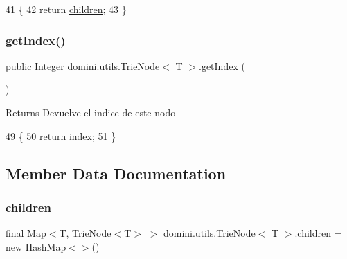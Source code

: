 \begin{DoxyCode}
41                                              \{
42         \textcolor{keywordflow}{return} \hyperlink{classdomini_1_1utils_1_1TrieNode_ae64d9c12696f526eecb3ff15aa290640}{children};
43     \}
\end{DoxyCode}
\mbox{\label{classdomini_1_1utils_1_1TrieNode_ac8e79df6ce5e7b33c6d08a0fe0681916}} 
\subsubsection{\texorpdfstring{get\+Index()}{getIndex()}}
{\footnotesize\ttfamily public Integer \hyperlink{classdomini_1_1utils_1_1TrieNode}{domini.\+utils.\+Trie\+Node}$<$ T $>$.get\+Index (\begin{DoxyParamCaption}{ }\end{DoxyParamCaption})\hspace{0.3cm}{\ttfamily [inline]}}

\begin{DoxyReturn}{Returns}
Devuelve el indice de este nodo 
\end{DoxyReturn}

\begin{DoxyCode}
49                              \{
50         \textcolor{keywordflow}{return} \hyperlink{classdomini_1_1utils_1_1TrieNode_a9c247bc6568131e5e6ad0758adb67bfa}{index};
51     \}
\end{DoxyCode}


\subsection{Member Data Documentation}
\mbox{\label{classdomini_1_1utils_1_1TrieNode_ae64d9c12696f526eecb3ff15aa290640}} 
\subsubsection{\texorpdfstring{children}{children}}
{\footnotesize\ttfamily final Map$<$T, \hyperlink{classdomini_1_1utils_1_1TrieNode}{Trie\+Node}$<$T$>$ $>$ \hyperlink{classdomini_1_1utils_1_1TrieNode}{domini.\+utils.\+Trie\+Node}$<$ T $>$.children = new Hash\+Map$<$$>$()\hspace{0.3cm}{\ttfamily [private]}}


